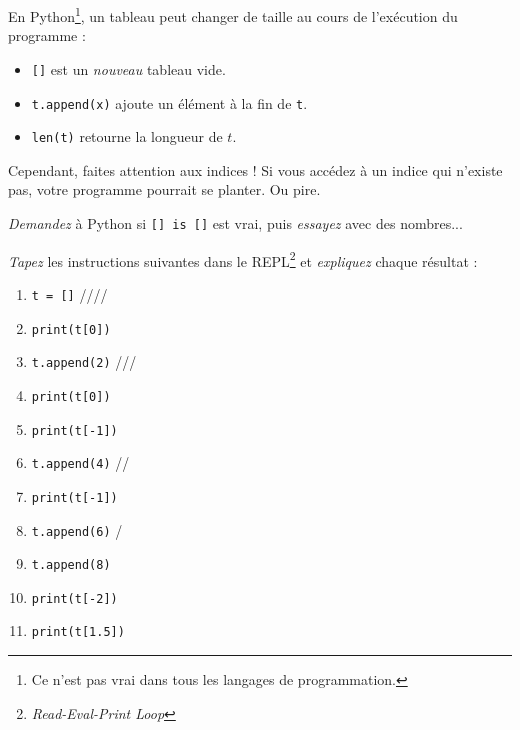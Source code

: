 En Python\footnote{Ce n'est pas vrai dans tous les langages de programmation.},
un tableau peut changer de taille au cours de l'exécution du programme :
\begin{itemize}
\item \texttt{[]} est un \emph{nouveau} tableau vide.
\item \texttt{t.append(x)} ajoute un élément à la fin de \texttt{t}.
\item \texttt{len(t)} retourne la longueur de $t$.
\end{itemize}
Cependant, faites attention aux indices ! Si vous accédez à un indice qui
n'existe pas, votre programme pourrait se planter. Ou pire.

\begin{exo}[Bonus]
\emph{Demandez} à Python si \texttt{[] is []} est vrai,
puis \emph{essayez} avec des nombres...
\end{exo}

\begin{exo}
\emph{Tapez} les instructions suivantes dans le
REPL\footnote{\emph{Read-Eval-Print Loop}} et
\emph{expliquez} chaque résultat :
\begin{enumerate}
	\item \texttt{t = []} 
		\dotfill \boxes ////
	\item \texttt{print(t[0])} 
		\dotfill
	\item \texttt{t.append(2)}
		\dotfill {}///
	\item \texttt{print(t[0])} 
		\dotfill
	\item \texttt{print(t[-1])} 
		\dotfill
	\item \texttt{t.append(4)}
		\dotfill {}//
	\item \texttt{print(t[-1])} 
		\dotfill
	\item \texttt{t.append(6)}
		\dotfill {}/
	\item \texttt{t.append(8)}
		\dotfill {}
	\item \texttt{print(t[-2])} 
		\dotfill
	\item \texttt{print(t[1.5])} 
		\dotfill
\end{enumerate}
\end{exo}

